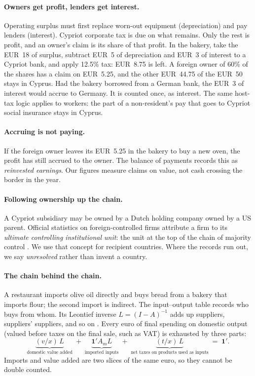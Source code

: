 \documentclass[11pt]{article}
\newcommand{\EUR}{EUR~}
\begin{document}
\paragraph{Owners get profit, lenders get interest.}
Operating surplus must first replace worn-out equipment (depreciation) and pay lenders (interest).
Cypriot corporate tax is due on what remains.
Only the rest is profit, and an owner's claim is its share of that profit.
In the bakery, take the \EUR18 of surplus, subtract \EUR5 of depreciation and \EUR3 of interest to a Cypriot bank, and apply 12.5\% tax: \EUR8.75 is left.
A foreign owner of 60\% of the shares has a claim on \EUR5.25, and the other \EUR44.75 of the \EUR50 stays in Cyprus.
Had the bakery borrowed from a German bank, the \EUR3 of interest would accrue to Germany.
It is counted once, as interest.
The same host-tax logic applies to workers: the part of a non-resident's pay that goes to Cypriot social insurance stays in Cyprus.

\paragraph{Accruing is not paying.}
If the foreign owner leaves its \EUR5.25 in the bakery to buy a new oven, the profit has still accrued to the owner.
The balance of payments records this as \emph{reinvested earnings}.
Our figures measure claims on value, not cash crossing the border in the year.

\paragraph{Following ownership up the chain.}
A Cypriot subsidiary may be owned by a Dutch holding company owned by a US parent.
Official statistics on foreign-controlled firms attribute a firm to its \emph{ultimate controlling institutional unit}: the unit at the top of the chain of majority control \citep{OECD2008BMD}.
We use that concept for recipient countries.
Where the records run out, we say \emph{unresolved} rather than invent a country.

\paragraph{The chain behind the chain.}
A restaurant imports olive oil directly and buys bread from a bakery that imports flour; the second import is indirect.
The input--output table records who buys from whom.
Its Leontief inverse $L=(I-A)^{-1}$ adds up suppliers, suppliers' suppliers, and so on \citep{Leontief1936,MillerBlair2009}.
Every euro of final spending on domestic output (valued before taxes on the final sale, such as VAT) is exhausted by three parts:
\begin{equation}
\underbrace{(v/x)\,L}_{\text{domestic value added}} \;+\; \underbrace{\mathbf 1' A_m L}_{\text{imported inputs}} \;+\; \underbrace{(t/x)\,L}_{\text{net taxes on products used as inputs}} \;=\; \mathbf 1'.
\label{eq:exhaust}
\end{equation}
Imports and value added are two slices of the same euro, so they cannot be double counted.
\end{document}
